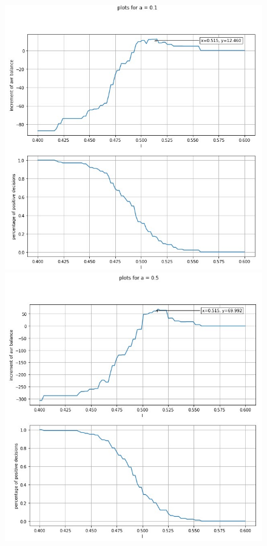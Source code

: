 \documentclass{article}
\begin{document}
\begin{figure}[H]
	\begin{minipage}[h]{0.48\linewidth}
		\includegraphics[width=1.0\linewidth]{assets/plot_a01_v2.jpg}
	\end{minipage}
	\hfill
	\begin{minipage}[h]{0.48\linewidth}
		\includegraphics[width=1.0\linewidth]{assets/plot_a05_v2.jpg}

\end{minipage}
\end{figure}
\end{document}
